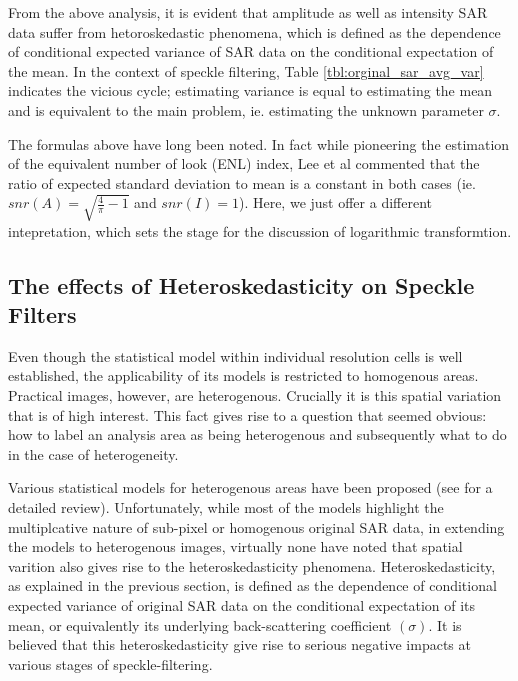 \documentclass[journal]{IEEEtran}
\begin{document}
From the above analysis, it is evident that amplitude as well as intensity SAR data suffer from hetoroskedastic phenomena, which is defined as the dependence of conditional expected variance of SAR data on the conditional expectation of the mean. 
In the context of speckle filtering, Table \ref{tbl:orginal_sar_avg_var} indicates the vicious cycle; estimating variance is equal to estimating the mean and is equivalent to the main problem, ie. estimating the unknown parameter $\sigma$. 

The formulas above have long been noted. In fact while pioneering the estimation of the equivalent number of look (ENL) index, Lee et al commented that the ratio of expected standard deviation to mean is a constant in both cases (ie. $snr(A)=\sqrt{\frac{4}{\pi}-1}$ and $snr(I)=1$). Here, we just offer a different intepretation, which sets the stage for the discussion of logarithmic transformtion. 

\subsection{The effects of Heteroskedasticity on Speckle Filters}

Even though the statistical model within individual resolution cells is well established, the applicability of its models is restricted to homogenous areas. 
Practical images, however, are heterogenous. Crucially it is this spatial variation that is of high interest. This fact gives rise to a question that seemed obvious: how to label an analysis area as being heterogenous and subsequently what to do in the case of heterogeneity.

Various statistical models for heterogenous areas have been proposed (see \cite{Touzi_2002_TGRS} for a detailed review). 
Unfortunately, while most of the models highlight the multiplcative nature of sub-pixel or homogenous original SAR data, in extending the models to heterogenous images, virtually none have noted that spatial varition also gives rise to the heteroskedasticity phenomena. 
Heteroskedasticity, as explained in the previous section, is defined as the dependence of conditional expected variance of original SAR data on the conditional expectation of its mean, or equivalently its underlying back-scattering coefficient $(\sigma)$.
It is believed that this heteroskedasticity give rise to serious negative impacts at various stages of speckle-filtering. 
\end{document}
